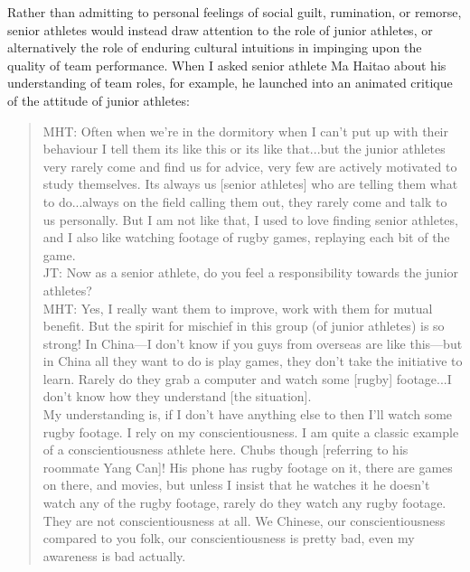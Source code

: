 \begin{CJK}{UTF8}{gbsn}
Rather than admitting to personal feelings of social guilt, rumination, or remorse, senior athletes would instead draw attention to the role of junior athletes, or alternatively the role of enduring cultural intuitions in impinging upon the quality of team performance.  When I asked senior athlete Ma Haitao about his understanding of team roles, for example, he launched into an animated critique of the attitude of junior athletes:

  \begin{quote}
    MHT: Often when we're in the dormitory when I can't put up with their behaviour I tell them its like this or its like that...but the junior athletes very rarely come and find us for advice, very few are actively motivated to study themselves. Its always us [senior athletes] who are telling them what to do...always on the field calling them out, they rarely come and talk to us personally.  But I am not like that, I used to love finding senior athletes, and I also like watching footage of rugby games, replaying each bit of the game.\\

    JT: Now as a senior athlete, do you feel a responsibility towards the junior athletes?\\

    MHT: Yes, I really want them to improve, work with them for mutual benefit.  But the spirit for mischief in this group (of junior athletes) is so strong! In China---I don't know if you guys from overseas are like this---but in China all they want to do is play games, they don't take the initiative to learn.  Rarely do they grab a computer and watch some [rugby] footage...I don’t know how they understand [the situation].
\\
    My understanding is, if I don’t have anything else to then I’ll watch some rugby footage. I rely on my conscientiousness.  I am quite a classic example of a conscientiousness athlete here.  Chubs though [referring to his roommate Yang Can]!  His phone has rugby footage on it, there are games on there, and movies, but unless I insist that he watches it he doesn't watch any of the rugby footage, rarely do they watch any rugby footage.  They are not conscientiousness at all. We Chinese, our conscientiousness compared to you folk, our conscientiousness is pretty bad, even my awareness is bad actually.
  \end{quote}


\end{CJK}
